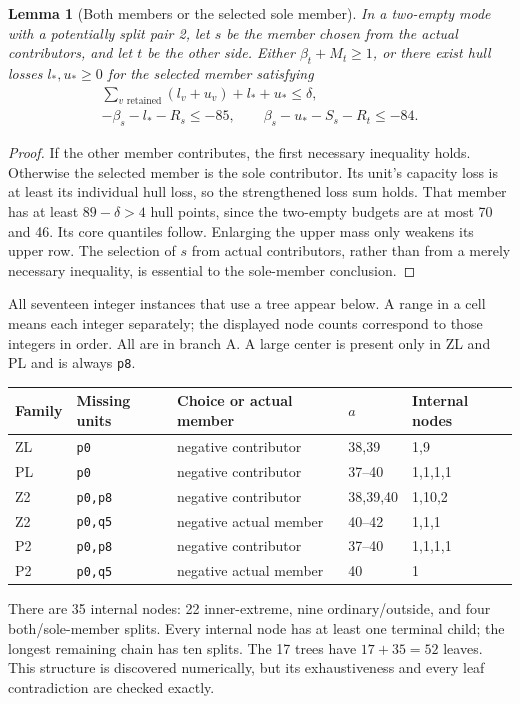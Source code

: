 \documentclass[11pt,a4paper]{article}
\newtheorem{lemma}[theorem]{Lemma}
\begin{document}
\begin{lemma}[Both members or the selected sole member]\label{lem:pair}
In a two-empty mode with a potentially split pair 2, let $s$ be the
member chosen from the actual contributors, and let $t$ be the other
side. Either $\beta_t+M_t\ge1$, or there exist hull losses $l_*,u_*\ge0$
for the selected member satisfying
\begin{gather*}
 \sum_{v\text{ retained}}(l_v+u_v)+l_*+u_*\le\delta,\\
 -\beta_s-l_*-R_s\le-85,\qquad
 \beta_s-u_*-S_s-R_t\le-84.
\end{gather*}
\end{lemma}
\begin{proof}
If the other member contributes, the first necessary inequality holds.
Otherwise the selected member is the sole contributor. Its unit's
capacity loss is at least its individual hull loss, so the strengthened
loss sum holds. That member has at least $89-\delta>4$ hull points,
since the two-empty budgets are at most 70 and 46. Its core quantiles
follow. Enlarging the upper mass only weakens its upper row. The
selection of $s$ from actual contributors, rather than from a merely
necessary inequality, is essential to the sole-member conclusion.
\end{proof}

All seventeen integer instances that use a tree appear below.
A range in a cell means each integer separately; the displayed node
counts correspond to those integers in order. All are in branch A.
A large center is present only in ZL and PL and is always \texttt{p8}.
\begin{center}\small
\begin{tabular}{lllll}
\toprule
Family&Missing units&Choice or actual member&$a$&Internal nodes\\
\midrule
ZL&\texttt{p0}&negative contributor&38,39&1,9\\
PL&\texttt{p0}&negative contributor&37--40&1,1,1,1\\
Z2&\texttt{p0,p8}&negative contributor&38,39,40&1,10,2\\
Z2&\texttt{p0,q5}&negative actual member&40--42&1,1,1\\
P2&\texttt{p0,p8}&negative contributor&37--40&1,1,1,1\\
P2&\texttt{p0,q5}&negative actual member&40&1\\
\bottomrule
\end{tabular}
\end{center}
There are 35 internal nodes: 22 inner-extreme, nine ordinary/outside,
and four both/sole-member splits. Every internal node has at least one
terminal child; the longest remaining chain has ten splits. The 17
trees have $17+35=52$ leaves. This structure is discovered numerically,
but its exhaustiveness and every leaf contradiction are checked exactly.
\end{document}
